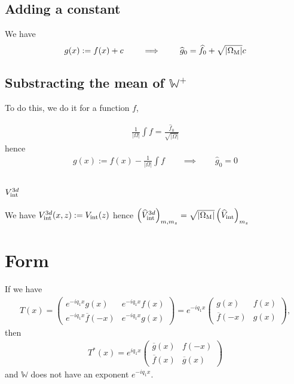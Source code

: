\documentclass[11pt,a4paper,reqno,french,tikz]{amsart}
\newcommand{\pa}[1]{\left( #1 \right)} %
\newcommand{\ab}[1]{\left|#1\right|} %
\newcommand{\f}[2]{\frac{#1}{#2}} %
\newcommand{\ind}[1]{_{\textup{#1}}} %
\newcommand{\mat}[1]{\begin{pmatrix} #1 \end{pmatrix}} %
\def\bbW{{\mathbb W}}
\newcommand{\sqom}{\sqrt{\ab{\Omega\ind{M}}}}
\begin{document}
\subsection{Adding a constant}%
\label{sub:adding_a_constant}
We have
\begin{align*}
g(x) := f(x) + c \qquad \implies \qquad \widehat{g}_0 = \widehat{f}_0 + \sqom c
\end{align*}

\subsection{Substracting the mean of $\bbW^+$}%
\label{sub:substracting_the_mean_of_bbw_}

To do this, we do it for a function $f$, 

\begin{align*}
\frac{1}{\ab{\Omega}} \int f = \f{\widehat{f}_{0}}{\sqrt{\ab{\Omega}}}
\end{align*}
hence
\begin{align*}
g(x) := f(x) -  \frac{1}{\ab{\Omega}} \int f \qquad \implies \qquad \widehat{g}_0 = 0
\end{align*}


\subsection{$V\ind{int}^{3d}$}%
\label{sub:_v__int}

We have $V\ind{int}^{3d}(x,z) := V\ind{int}(z)$ hence $\pa{\widehat{V}\ind{int}^{3d}}_{m,m_z} = \sqom \pa{\widehat{V}\ind{int}}_{m_z}$


\section{Form}%
\label{sec:form}

If we have
\begin{align*}
	T(x) = \mat{e^{-iq_1 x} g(x) & e^{-iq_1 x} f(x) \\ e^{-iq_1 x}\overline{f}(-x) & e^{-iq_1 x}g(x)} = e^{-iq_1 x}\mat{ g(x) &  f(x) \\ \overline{f}(-x) & g(x)},
\end{align*}
then
\begin{align*}
T^*(x) = e^{iq_1 x}\mat{ \overline{g}(x) &  f(-x) \\ \overline{f}(x) & \overline{g}(x)}
\end{align*}
and $\bbW$ does not have an exponent $e^{-iq_1 x}$.
\end{document}
